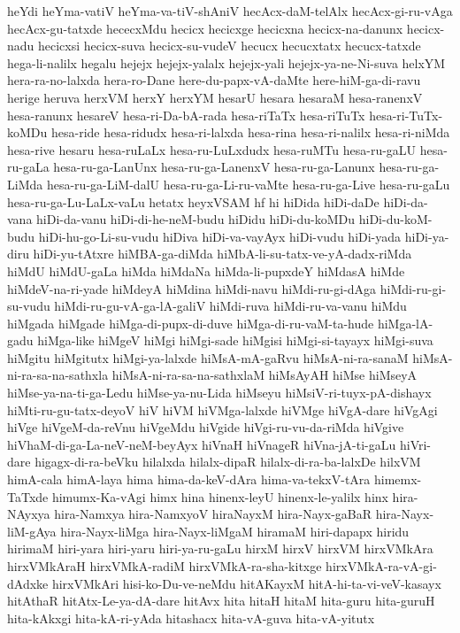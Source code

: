 {heYdi
heYma-vatiV
heYma-va-tiV-shAniV
hecAcx-daM-telAlx
hecAcx-gi-ru-vAga
hecAcx-gu-tatxde
hececxMdu
hecicx
hecicxge
hecicxna
hecicx-na-danunx
hecicx-nadu
hecicxsi
hecicx-suva
hecicx-su-vudeV
hecucx
hecucxtatx
hecucx-tatxde
hega-li-nalilx
hegalu
hejejx
hejejx-yalalx
hejejx-yali
hejejx-ya-ne-Ni-suva
helxYM
hera-ra-no-lalxda
hera-ro-Dane
here-du-papx-vA-daMte
here-hiM-ga-di-ravu
herige
heruva
herxVM
herxY
herxYM
hesarU
hesara
hesaraM
hesa-ranenxV
hesa-ranunx
hesareV
hesa-ri-Da-bA-rada
hesa-riTaTx
hesa-riTuTx
hesa-ri-TuTx-koMDu
hesa-ride
hesa-ridudx
hesa-ri-lalxda
hesa-rina
hesa-ri-nalilx
hesa-ri-niMda
hesa-rive
hesaru
hesa-ruLaLx
hesa-ru-LuLxdudx
hesa-ruMTu
hesa-ru-gaLU
hesa-ru-gaLa
hesa-ru-ga-LanUnx
hesa-ru-ga-LanenxV
hesa-ru-ga-Lanunx
hesa-ru-ga-LiMda
hesa-ru-ga-LiM-dalU
hesa-ru-ga-Li-ru-vaMte
hesa-ru-ga-Live
hesa-ru-gaLu
hesa-ru-ga-Lu-LaLx-vaLu
hetatx
heyxVSAM
hf
hi
hiDida
hiDi-daDe
hiDi-da-vana
hiDi-da-vanu
hiDi-di-he-neM-budu
hiDidu
hiDi-du-koMDu
hiDi-du-koM-budu
hiDi-hu-go-Li-su-vudu
hiDiva
hiDi-va-vayAyx
hiDi-vudu
hiDi-yada
hiDi-ya-diru
hiDi-yu-tAtxre
hiMBA-ga-diMda
hiMbA-li-su-tatx-ve-yA-dadx-riMda
hiMdU
hiMdU-gaLa
hiMda
hiMdaNa
hiMda-li-pupxdeY
hiMdasA
hiMde
hiMdeV-na-ri-yade
hiMdeyA
hiMdina
hiMdi-navu
hiMdi-ru-gi-dAga
hiMdi-ru-gi-su-vudu
hiMdi-ru-gu-vA-ga-lA-galiV
hiMdi-ruva
hiMdi-ru-va-vanu
hiMdu
hiMgada
hiMgade
hiMga-di-pupx-di-duve
hiMga-di-ru-vaM-ta-hude
hiMga-lA-gadu
hiMga-like
hiMgeV
hiMgi
hiMgi-sade
hiMgisi
hiMgi-si-tayayx
hiMgi-suva
hiMgitu
hiMgitutx
hiMgi-ya-lalxde
hiMsA-mA-gaRvu
hiMsA-ni-ra-sanaM
hiMsA-ni-ra-sa-na-sathxla
hiMsA-ni-ra-sa-na-sathxlaM
hiMsAyAH
hiMse
hiMseyA
hiMse-ya-na-ti-ga-Ledu
hiMse-ya-nu-Lida
hiMseyu
hiMsiV-ri-tuyx-pA-dishayx
hiMti-ru-gu-tatx-deyoV
hiV
hiVM
hiVMga-lalxde
hiVMge
hiVgA-dare
hiVgAgi
hiVge
hiVgeM-da-reVnu
hiVgeMdu
hiVgide
hiVgi-ru-vu-da-riMda
hiVgive
hiVhaM-di-ga-La-neV-neM-beyAyx
hiVnaH
hiVnageR
hiVna-jA-ti-gaLu
hiVri-dare
higagx-di-ra-beVku
hilalxda
hilalx-dipaR
hilalx-di-ra-ba-lalxDe
hilxVM
himA-cala
himA-laya
hima
hima-da-keV-dAra
hima-va-tekxV-tAra
himemx-TaTxde
himumx-Ka-vAgi
himx
hina
hinenx-leyU
hinenx-le-yalilx
hinx
hira-NAyxya
hira-Namxya
hira-NamxyoV
hiraNayxM
hira-Nayx-gaBaR
hira-Nayx-liM-gAya
hira-Nayx-liMga
hira-Nayx-liMgaM
hiramaM
hiri-dapapx
hiridu
hirimaM
hiri-yara
hiri-yaru
hiri-ya-ru-gaLu
hirxM
hirxV
hirxVM
hirxVMkAra
hirxVMkAraH
hirxVMkA-radiM
hirxVMkA-ra-sha-kitxge
hirxVMkA-ra-vA-gi-dAdxke
hirxVMkAri
hisi-ko-Du-ve-neMdu
hitAKayxM
hitA-hi-ta-vi-veV-kasayx
hitAthaR
hitAtx-Le-ya-dA-dare
hitAvx
hita
hitaH
hitaM
hita-guru
hita-guruH
hita-kAkxgi
hita-kA-ri-yAda
hitashacx
hita-vA-guva
hita-vA-yitutx
}
